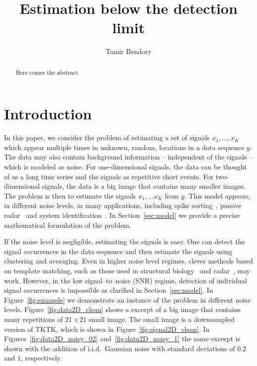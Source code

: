 \documentclass[english,11pt]{article}
\numberwithin{equation}{section}
\theoremstyle{plain}
\theoremstyle{definition}
\theoremstyle{remark}
\theoremstyle{plain}
\theoremstyle{remark}
\theoremstyle{plain}
\theoremstyle{plain}
\newcommand{\SNR}{{\textsf{SNR}}}
\begin{document}
\title{Estimation below the detection limit}


\author{Tamir Bendory}
\maketitle

\begin{abstract}
	Here comes the abstract
\end{abstract}

\section{Introduction}

In this paper, we consider the problem of estimating a set of signals $x_1,\ldots,x_K$ which appear multiple times in unknown, random, locations in a data sequence $y$. The data may also contain background information -- independent of the signals -- which is modeled as noise.
For one-dimensional signals, the data can be thought of as a long time series and the signals as repetitive short events. For two-dimensional signals, the data is a big image that contains many smaller images.  
The problem is then to estimate the signals $x_1,\ldots x_K$ from $y$. This
model appears, in different noise levels, in many applications, including spike sorting~\cite{lewicki1998review}, passive radar~\cite{gogineni2017passive} and system identification~\cite{ljung1998system}.
In Section~\ref{sec:model} we provide a precise mathematical formulation of the problem.

If the noise level is negligible, estimating the signals is easy.
One can detect the signal occurrences in the data sequence and then estimate the signals using clustering and averaging.
Even in higher noise level regimes, clever methods based on template matching, such as those used in structural biology~\cite{heimowitz2018apple} and radar~\cite{gogineni2017passive}, may work.
However, in the low signal--to--noise (\SNR) regime, detection of individual signal occurrences is impossible as clarified in Section~\ref{sec:model}. In Figure~\ref{fig:example} we demonstrate an instance of the problem in different noise levels. Figure~\ref{fig:data2D_clean} shows a excerpt of a big image that contains many repetitions of $21\times 21$ small image. The small image is a downsampled version of TKTK, which is shown in Figure~\ref{fig:signal2D_clean}. In Figures~\ref{fig:data2D_noisy_02} and~\ref{fig:data2D_noisy_1} the same excerpt is shown with the addition of i.i.d.\ Gaussian noise with standard deviations of $0.2$ and $1$, respectively.  
\end{document}
